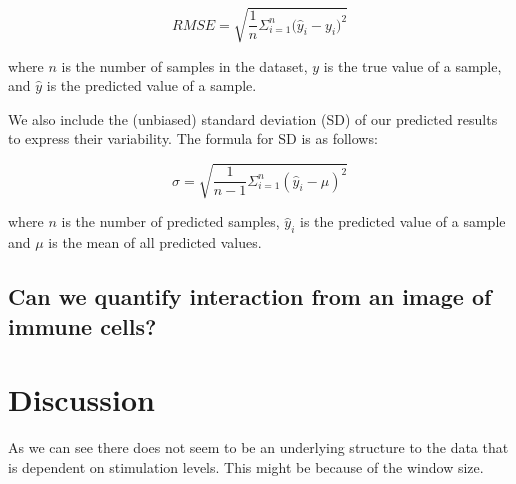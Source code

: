 \begin{equation*}
    RMSE = \sqrt{\frac{1}{n}{\Sigma_{i=1}^{n}{\Big({\hat{y}_i-y_i})}^2}}
\end{equation*}

where $n$ is the number of samples in the dataset, $y$ is the true value of a sample, and $\hat{y}$ is the predicted value of a sample.

We also include the (unbiased) standard deviation (SD) of our predicted results to express their variability. The formula for SD is as follows:

\begin{equation*}
    \sigma = \sqrt{\frac{1}{n-1}\Sigma_{i=1}^{n}{(\hat{y}_i - \mu)}^2}
\end{equation*}

where $n$ is the number of predicted samples, $\hat{y}_i$ is the predicted value of a sample and $\mu$ is the mean of all predicted values.

\subsection{Can we quantify interaction from an image of immune cells?}

\section{Discussion}

As we can see there does not seem to be an underlying structure to the data that is dependent on stimulation levels. This might be because of the window size.
